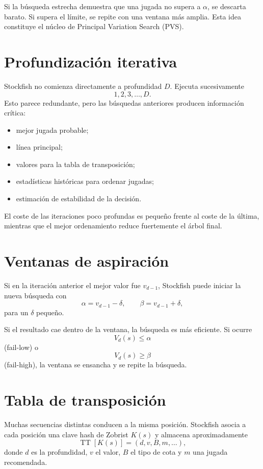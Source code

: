 \documentclass[11pt,a4paper]{article}
\begin{document}
Si la búsqueda estrecha demuestra que una jugada no supera a $\alpha$, se descarta barato. Si supera el límite, se repite con una ventana más amplia. Esta idea constituye el núcleo de Principal Variation Search (PVS).

\section{Profundización iterativa}

Stockfish no comienza directamente a profundidad $D$. Ejecuta sucesivamente
\[
1,2,3,\ldots,D.
\]
Esto parece redundante, pero las búsquedas anteriores producen información crítica:
\begin{itemize}
    \item mejor jugada probable;
    \item línea principal;
    \item valores para la tabla de transposición;
    \item estadísticas históricas para ordenar jugadas;
    \item estimación de estabilidad de la decisión.
\end{itemize}

El coste de las iteraciones poco profundas es pequeño frente al coste de la última, mientras que el mejor ordenamiento reduce fuertemente el árbol final.

\section{Ventanas de aspiración}

Si en la iteración anterior el mejor valor fue $v_{d-1}$, Stockfish puede iniciar la nueva búsqueda con
\[
    \alpha = v_{d-1}-\delta, \qquad
    \beta = v_{d-1}+\delta,
\]
para un $\delta$ pequeño.

Si el resultado cae dentro de la ventana, la búsqueda es más eficiente. Si ocurre
\[
V_d(s)\le \alpha
\]
(fail-low) o
\[
V_d(s)\ge \beta
\]
(fail-high), la ventana se ensancha y se repite la búsqueda.

\section{Tabla de transposición}

Muchas secuencias distintas conducen a la misma posición. Stockfish asocia a cada posición una clave hash de Zobrist $K(s)$ y almacena aproximadamente
\[
\operatorname{TT}[K(s)] = (d,v,B,m,\ldots),
\]
donde $d$ es la profundidad, $v$ el valor, $B$ el tipo de cota y $m$ una jugada recomendada.
\end{document}
